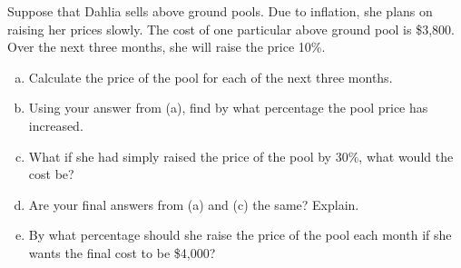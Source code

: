 \documentclass[11pt,letterpaper]{article}
\begin{document}
\newpage



 Suppose that Dahlia sells above ground pools. Due to inflation, she plans on raising her prices slowly. The cost of one particular above ground pool is \$3,800. Over the next three months, she will raise the price 10\%. 
	\begin{enumerate}[(a)]
	\item Calculate the price of the pool for each of the next three months. 
	\item Using your answer from (a), find by what percentage the pool price has increased. 
	\item What if she had simply raised the price of the pool by 30\%, what would the cost be?
	\item Are your final answers from (a) and (c) the same? Explain. 
	\item By what percentage should she raise the price of the pool each month if she wants the final cost to be \$4,000?
	\end{enumerate} \pspace
\end{document}
